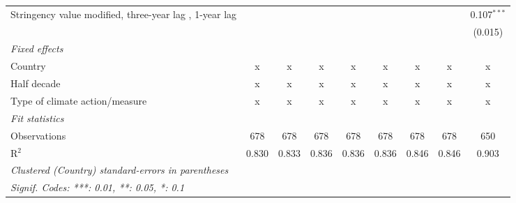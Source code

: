 \begin{table}[htbp]
\begin{tabular}{lcccccccc}
      Stringency value modified, three-year lag , 1-year lag                        &                &               &               &               &               &                &                & 0.107$^{***}$\\   
                                                                                    &                &               &               &               &               &                &                & (0.015)\\   
      \emph{Fixed effects}\\
      Country                                                                       & x              & x             & x             & x             & x             & x              & x              & x\\  
      Half decade                                                                   & x              & x             & x             & x             & x             & x              & x              & x\\  
      Type of climate action/measure                                                & x              & x             & x             & x             & x             & x              & x              & x\\  
      \midrule \emph{Fit statistics}\\
      Observations                                                                  & 678            & 678           & 678           & 678           & 678           & 678            & 678            & 650\\  
      R$^2$                                                                         & 0.830          & 0.833         & 0.836         & 0.836         & 0.836         & 0.846          & 0.846          & 0.903\\  
      \midrule
      \multicolumn{9}{l}{\emph{Clustered (Country) standard-errors in parentheses}}\\
      \multicolumn{9}{l}{\emph{Signif. Codes: ***: 0.01, **: 0.05, *: 0.1}}\\
   \end{tabular}
\end{table}


